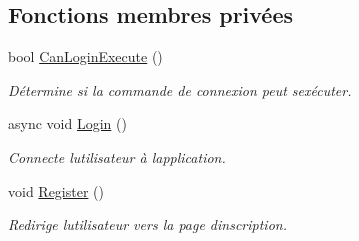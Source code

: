 \subsection*{Fonctions membres privées}
\begin{DoxyCompactItemize}
\item 
bool \hyperlink{class_boxes_1_1_view_models_1_1_login_view_model_acc4fcf0f4038e867c64e0fc18245a6e3}{Can\+Login\+Execute} ()
\begin{DoxyCompactList}\small\item\em Détermine si la commande de connexion peut s\textquotesingle{}exécuter. \end{DoxyCompactList}\item 
async void \hyperlink{class_boxes_1_1_view_models_1_1_login_view_model_a690178426074be27e93f1f99cbe7fb01}{Login} ()
\begin{DoxyCompactList}\small\item\em Connecte l\textquotesingle{}utilisateur à l\textquotesingle{}application. \end{DoxyCompactList}\item 
void \hyperlink{class_boxes_1_1_view_models_1_1_login_view_model_a6dcfc414b7b38fac178af6bea17cc55b}{Register} ()
\begin{DoxyCompactList}\small\item\em Redirige l\textquotesingle{}utilisateur vers la page d\textquotesingle{}inscription. \end{DoxyCompactList}\end{DoxyCompactItemize}
